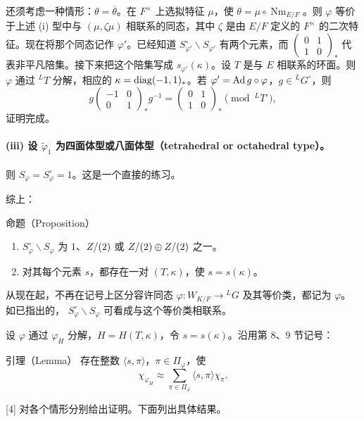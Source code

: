 还须考虑一种情形：$\theta=\overline\theta$。在 $F^\times$ 上选拟特征 $\mu$，使
$\theta=\mu\circ\operatorname{Nm}_{E/F}$。则 $\varphi$ 等价于上述 (i) 型中与
$(\mu,\zeta\mu)$ 相联系的同态，其中 $\zeta$ 是由 $E/F$ 定义的 $F^\times$ 的二次特征。现在将那个同态记作 $\varphi'$。已经知道
$S_{\varphi'}^\circ\backslash S_{\varphi'}$ 有两个元素，而
$\begin{pmatrix}0&1\\1&0\end{pmatrix}_*$ 代表非平凡陪集。接下来把这个陪集写成
$s_{\varphi'}(\kappa)$。设 $T$ 是与 $E$ 相联系的环面。则 $\varphi$ 通过 ${}^LT$ 分解，相应的
$\kappa=\operatorname{diag}(-1,1)_*$。若 $\varphi'=\operatorname{Ad} g\circ\varphi$，$g\in{}^LG^\circ$，则
\[
g\begin{pmatrix}-1&0\\0&1\end{pmatrix}_*g^{-1}
=\begin{pmatrix}0&1\\1&0\end{pmatrix}_*\pmod{{}^LT^\circ},
\]
证明完成。

\paragraph*{(iii) 设 $\widetilde\varphi_1$ 为四面体型或八面体型（tetrahedral or octahedral type）。}
则 $S_\varphi=S_\varphi^\circ=1$。这是一个直接的练习。

综上：
\begin{originaltheorem}{命题（Proposition）}
\begin{enumerate}
\item[(1)] $S_\varphi^\circ\backslash S_\varphi$ 为
$1$、$Z/(2)$ 或 $Z/(2)\oplus Z/(2)$ 之一。
\item[(2)] 对其每个元素 $s$，都存在一对 $(T,\kappa)$，使 $s=s(\kappa)$。
\end{enumerate}
\end{originaltheorem}

从现在起，不再在记号上区分容许同态 $\varphi:W_{K/F}\to{}^LG$ 及其等价类，都记为 $\varphi$。如已指出的，
$S_\varphi^\circ\backslash S_\varphi$ 可看成与这个等价类相联系。

设 $\varphi$ 通过 $\varphi_H$ 分解，$H=H(T,\kappa)$，令 $s=s(\kappa)$。沿用第 8、9 节记号：
\begin{originaltheorem}{引理（Lemma）}
存在整数 $\langle s,\pi\rangle$，$\pi\in\Pi_\varphi$，使
\[
\chi_{\varphi_H}\approx\sum_{\pi\in\Pi_\varphi}\langle s,\pi\rangle\chi_\pi.
\]
\end{originaltheorem}
[4] 对各个情形分别给出证明。下面列出具体结果。

